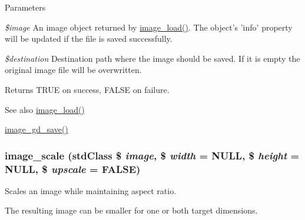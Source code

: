 \begin{DoxyParams}{Parameters}
\item[{\em \$image}]An image object returned by \hyperlink{group__image_ga96098e5b039dc3906a656fa889a04776}{image\_\-load()}. The object's 'info' property will be updated if the file is saved successfully. \item[{\em \$destination}]Destination path where the image should be saved. If it is empty the original image file will be overwritten.\end{DoxyParams}
\begin{DoxyReturn}{Returns}
TRUE on success, FALSE on failure.
\end{DoxyReturn}
\begin{DoxySeeAlso}{See also}
\hyperlink{group__image_ga96098e5b039dc3906a656fa889a04776}{image\_\-load()} 

\hyperlink{group__image_ga840179ad0e5ef2ea7619de19cab2d225}{image\_\-gd\_\-save()} 
\end{DoxySeeAlso}
\hypertarget{group__image_ga2eac147bb70d14d9439d6b0d54023ce3}{
\subsubsection[{image\_\-scale}]{\setlength{\rightskip}{0pt plus 5cm}image\_\-scale (stdClass \$ {\em image}, \/  \$ {\em width} = {\ttfamily NULL}, \/  \$ {\em height} = {\ttfamily NULL}, \/  \$ {\em upscale} = {\ttfamily FALSE})}}
\label{group__image_ga2eac147bb70d14d9439d6b0d54023ce3}
Scales an image while maintaining aspect ratio.

The resulting image can be smaller for one or both target dimensions.


